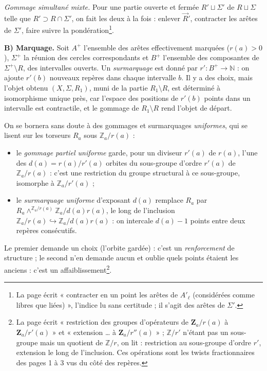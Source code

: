 \documentclass[11pt,a4paper]{article}
\begin{document}
\emph{Gommage simultané mixte.} Pour une partie ouverte et fermée $R' \sqcup
\Sigma'$ de $R \sqcup \Sigma$ telle que $R' \supset R \cap \Sigma'$, on fait les
deux à la fois : enlever $\vec{R}'$, contracter les arêtes de $\Sigma'$, faire
suivre la pondération\footnote{La page écrit « contracter en un point les arêtes
de $A'_\ell$ (considérées comme libres que liées) », l'indice lu sans certitude ;
il s'agit des arêtes de $\Sigma'$.}.

\textbf{B) Marquage.} Soit $A^{+}$ l'ensemble des arêtes effectivement marquées
($r(a) > 0$), $\Sigma^{+}$ la réunion des cercles correspondants et $B^{+}$
l'ensemble des composantes de $\Sigma^{+} \setminus R$, des intervalles ouverts.
Un \emph{surmarquage} est donné par $r' : B^{+} \to \mathbb{N}$ : on ajoute
$r'(b)$ nouveaux repères dans chaque intervalle $b$. Il y a des choix, mais
l'objet obtenu $(X, \Sigma, R_1)$, muni de la partie $R_1 \setminus R$, est
déterminé à isomorphisme unique près, car l'espace des positions de $r'(b)$ points
dans un intervalle est contractile, et le gommage de $R_1 \setminus R$ rend
l'objet de départ.

On se bornera sans doute à des gommages et surmarquages \emph{uniformes}, qui se
lisent sur les torseurs $R_a$ sous $\mathbb{Z}_a/r(a)$ :
\begin{itemize}
\item le \emph{gommage partiel uniforme} garde, pour un diviseur $r'(a)$ de
$r(a)$, l'une des $d(a) = r(a)/r'(a)$ orbites du sous-groupe d'ordre $r'(a)$ de
$\mathbb{Z}_a/r(a)$ : c'est une restriction du groupe structural à ce
sous-groupe, isomorphe à $\mathbb{Z}_a/r'(a)$ ;
\item le \emph{surmarquage uniforme} d'exposant $d(a)$ remplace $R_a$ par
$R_a \wedge^{\mathbb{Z}_a/r(a)} \mathbb{Z}_a/d(a)r(a)$, le long de l'inclusion
$\mathbb{Z}_a/r(a) \hookrightarrow \mathbb{Z}_a/d(a)r(a)$ : on intercale
$d(a) - 1$ points entre deux repères consécutifs.
\end{itemize}
Le premier demande un choix (l'orbite gardée) : c'est un \emph{renforcement} de
structure ; le second n'en demande aucun et oublie quels points étaient les
anciens : c'est un affaiblissement\footnote{La page écrit « restriction des
groupes d'opérateurs de $\mathbf{Z}_a/r(a)$ à $\mathbf{Z}_a/r'(a)$ » et
« extension \ldots{} à $\mathbf{Z}_a/r''(a)$ » ; $\mathbb{Z}/r'$ n'étant pas un
sous-groupe mais un quotient de $\mathbb{Z}/r$, on lit : restriction au
sous-groupe d'ordre $r'$, extension le long de l'inclusion. Ces opérations sont
les twists fractionnaires des pages 1 à 3 vus du côté des repères.}.
\end{document}
